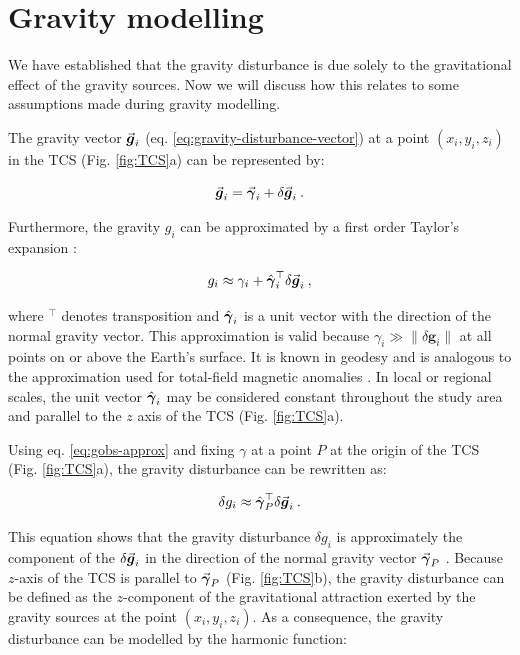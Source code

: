 \documentclass[extra]{gji}
\newcommand{\versor}[1]{\hat{\mitbf{#1}}}
\renewcommand{\vector}[1]{\vec{\mitbf{#1}}}
\begin{document}
\section{Gravity modelling}

We have established that the gravity disturbance is due solely to the
gravitational effect of the gravity sources.
Now we will discuss how this relates to some assumptions made during gravity
modelling.

The gravity vector $\vector{g}_i$ (eq. \ref{eq:gravity-disturbance-vector})
at a point $(x_i, y_i, z_i)$ in the TCS (Fig. \ref{fig:TCS}a) can be
represented by:

\begin{equation}
\vector{g}_i = \vector{\gamma}_i + \delta \vector{g}_i \: .
\label{eq:gravity-vector-TCS}
\end{equation}

\noindent
Furthermore, the gravity $g_i$ can be approximated by a first order Taylor's
expansion \citep{sanso_sideris2013}:

\begin{equation}
g_i \approx \gamma_i +
\versor{\gamma}_i^{\top} \delta \vector{g}_i \: ,
\label{eq:gobs-approx}
\end{equation}

\noindent
where $^{\top}$ denotes transposition and $\versor{\gamma}_{i}$ is a unit
vector with the direction of the normal gravity vector.
This approximation is valid because
$\gamma_{i} \gg \| \delta \mathbf{g}_{i} \|$ at all points on or above the
Earth's surface.
It is known in geodesy \citep[e.g.,][]{sanso_sideris2013}
and is analogous to the approximation used for
total-field magnetic anomalies \citep[e.g.,][]{blakely1996}.
In local or regional scales, the unit
vector $\versor{\gamma}_{i}$
may be considered constant throughout the study area and
parallel to the $z$ axis of the TCS (Fig. \ref{fig:TCS}a).

Using eq. \ref{eq:gobs-approx} and fixing $\gamma$ at a point $P$ at
the origin of the TCS (Fig. \ref{fig:TCS}a),
the gravity disturbance can be rewritten as:

\begin{equation}
\delta g_{i} \approx \versor{\gamma}_{P}^{\top} \delta \vector{g}_{i} \: .
\label{eq:gravity-disturbance-approx-TCS}
\end{equation}

\noindent
This equation shows that the gravity disturbance $\delta g_{i}$ is
approximately the component of the $\delta \vector{g}_{i}$ in the direction of
the normal gravity vector $\vector{\gamma}_P$
\citep{hofmann-wellenhof-moritz2005, sanso_sideris2013}.
Because $z$-axis of the TCS is parallel to $\vector{\gamma}_P$
(Fig. \ref{fig:TCS}b), the gravity disturbance can be defined as the
$z$-component of the gravitational attraction exerted by the gravity sources at
the point $(x_{i}, y_{i}, z_{i})$.
As a consequence, the gravity disturbance can be modelled by the harmonic
function:
\end{document}
